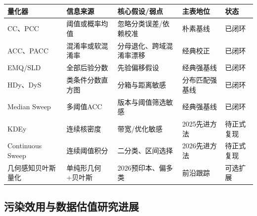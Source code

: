 \documentclass[
  chinese,
  12pt,
  a4paper,
  chinese,
  UTF8]{ctexart}
\begin{document}
\begin{longtable}[]{@{}
  >{\raggedright\arraybackslash}p{}
  >{\raggedright\arraybackslash}p{}
  >{\raggedright\arraybackslash}p{}
  >{\raggedright\arraybackslash}p{}
  >{\raggedright\arraybackslash}p{}@{}}
\toprule\noalign{}
\begin{minipage}[b]{\linewidth}\raggedright
量化器
\end{minipage} & \begin{minipage}[b]{\linewidth}\raggedright
信息来源
\end{minipage} & \begin{minipage}[b]{\linewidth}\raggedright
核心假设/弱点
\end{minipage} & \begin{minipage}[b]{\linewidth}\raggedright
主表地位
\end{minipage} & \begin{minipage}[b]{\linewidth}\raggedright
状态
\end{minipage} \\
\midrule\noalign{}
\endhead
\bottomrule\noalign{}
\endlastfoot
CC、PCC & 阈值或概率均值 & 忽略分类误差/依赖校准 & 朴素基线 & 已闭环 \\
ACC、PACC & 混淆率或软混淆率 & 分母退化、跨域混淆率漂移 & 经典校正 &
已闭环 \\
EMQ/SLD & 全部后验分数 & 先验偏移假设 & 经典强基线 & 已闭环 \\
HDy、DyS & 类条件分数直方图 & 分箱与距离敏感 & 分布匹配强基线 &
已闭环 \\
Median Sweep & 多阈值ACC & 版本与阈值筛选敏感 & 经典强基线 & 已闭环 \\
KDEy & 连续核密度 & 带宽/优化敏感 & 2025先进方法 & 待正式复现 \\
Continuous Sweep & 连续阈值积分 & 二分类、区间选择 & 2026先进方法 &
待正式复现 \\
几何感知贝叶斯量化 & 单纯形几何+贝叶斯 & 2026预印本、偏多类 & 前沿跟踪 &
可选扩展 \\
\end{longtable}

\subsection{污染效用与数据估值研究进展}\label{ux6c61ux67d3ux6548ux7528ux4e0eux6570ux636eux4f30ux503cux7814ux7a76ux8fdbux5c55}
\end{document}
